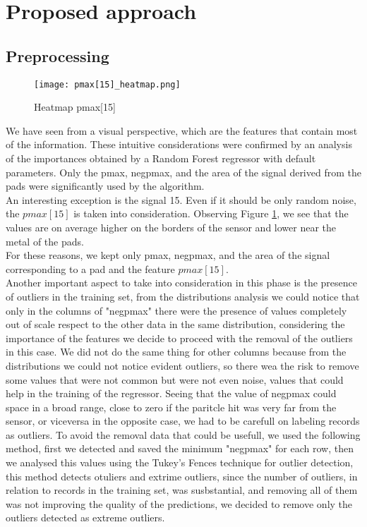 \documentclass[conference]{IEEEtran}
\begin{document}
\section{Proposed approach}
\subsection{Preprocessing}

\begin{figure}[htbp]
\centerline{\texttt{[image: pmax[15]\_heatmap.png]}}
\caption{Heatmap pmax[15]}
\label{fig:pmax[15]_heatmap}
\end{figure}
We have seen from a visual perspective, which are the features that contain most of the information. These intuitive considerations were confirmed by an analysis of the importances obtained by a Random Forest regressor with default parameters. Only the pmax, negpmax, and the area of the signal derived from the pads were significantly used by the algorithm.\\ %
An interesting exception is the signal 15. Even if it should be only random noise, the $pmax[15]$ is taken into consideration. Observing Figure \ref{fig:pmax[15]_heatmap}, we see that the values are on average higher on the borders of the sensor and lower near the metal of the pads. \\
For these reasons, we kept only pmax, negpmax, and the area of the signal corresponding to a pad and the feature $pmax[15]$.\\

Another important aspect to take into consideration in this phase is the presence of outliers in the training set, from the distributions analysis we could notice that only in the columns of "negpmax" there were the presence of values completely out of scale respect to the other data in the same distribution, considering the importance of the features we decide to proceed with the removal of the outliers in this case. We did not do the same thing for other columns because from
the distributions we could not notice evident outliers, so there wea the risk to remove some values that were not common but were not even noise, values that could help in the training of the regressor.
Seeing that the value of negpmax could space in a broad range, close to zero if the paritcle hit was very far from the sensor, or viceversa in the opposite case, we had to be carefull on labeling records as outliers. To avoid the removal data that could be usefull, we used the following method, first
we detected and saved the minimum "negpmax" for each row, then we analysed this values using the Tukey's Fences technique for outlier detection, this method detects otuliers and extrime outliers, since the number of outliers, in relation to records in the training set, was susbstantial, and removing all of them was not
improving the quality of the predictions, we decided to remove only the outliers detected as extreme outliers.
\end{document}
